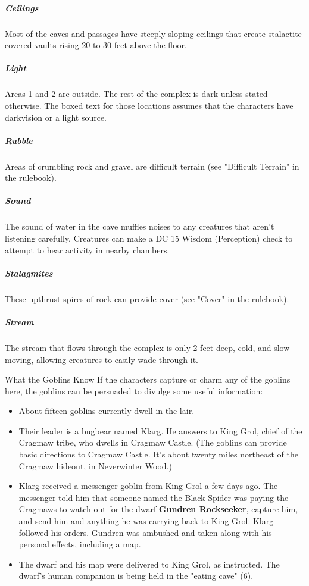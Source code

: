 \documentclass[10pt,a4paper,twoside,bg=print,twocolumn,openany,nodeprecatedcode]{dndbook}
\begin{document}
\subparagraph{Ceilings}
Most of the caves and passages have steeply sloping ceilings that create stalactite-covered vaults rising 20 to 30 feet above the floor.

\subparagraph{Light}
Areas 1 and 2 are outside. The rest of the complex is dark unless stated otherwise. The boxed text for those locations assumes that the characters have darkvision or a light source.

\subparagraph{Rubble}
Areas of crumbling rock and gravel are difficult terrain (see "Difficult Terrain" in the rulebook).

\subparagraph{Sound}
The sound of water in the cave muffles noises to any creatures that aren't listening carefully. Creatures can make a DC 15 Wisdom (Perception) check to attempt to hear activity in nearby chambers.

\subparagraph{Stalagmites}
These upthrust spires of rock can provide cover (see "Cover" in the rulebook).

\subparagraph{Stream}
The stream that flows through the complex is only 2 feet deep, cold, and slow moving, allowing creatures to easily wade through it.

\begin{DndSidebar}[float=!b]{What the Goblins Know}
If the characters capture or charm any of the goblins here, the goblins can be persuaded to divulge some useful information:




\begin{itemize}
\item About fifteen goblins currently dwell in the lair.
\item Their leader is a bugbear named Klarg. He answers to King Grol, chief of the Cragmaw tribe, who dwells in Cragmaw Castle. (The goblins can provide basic directions to Cragmaw Castle. It's about twenty miles northeast of the Cragmaw hideout, in Neverwinter Wood.)
\item Klarg received a messenger goblin from King Grol a few days ago. The messenger told him that someone named the Black Spider was paying the Cragmaws to watch out for the dwarf \textbf{Gundren Rockseeker}, capture him, and send him and anything he was carrying back to King Grol. Klarg followed his orders. Gundren was ambushed and taken along with his personal effects, including a map.
\item The dwarf and his map were delivered to King Grol, as instructed. The dwarf's human companion is being held in the "eating cave" (6).
\end{itemize}



\end{DndSidebar}
\end{document}
